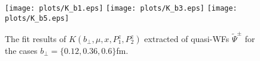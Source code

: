 \documentclass[prd,aps,twocolumn,preprintnumbers, showpacs, nofootinbib,superscriptaddress,notitlepage]{revtex4-1}
\begin{document}
\begin{widetext}
\begin{figure}
    \centering
    \texttt{[image: plots/K\_b1.eps]}
    \texttt{[image: plots/K\_b3.eps]}
    \texttt{[image: plots/K\_b5.eps]}
    \caption{The fit results of $K(b_{\perp},\mu,x,P^z_1,P^z_2)$ extracted of quasi-WFs $\tilde{\Psi}^{\pm}$ for the cases $b_{\perp}=\{0.12,0.36,0.6\}$fm.}
    \label{fig:x_dep_fit_CS_kernel}
\end{figure}

\end{widetext}


\begin{thebibliography}{11}




\end{thebibliography}
\end{document}
